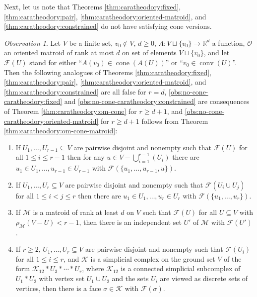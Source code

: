 \documentclass[a4paper,11pt,reqno, english]{amsart}
\theoremstyle{definition}
\theoremstyle{remark}
\newtheorem{observation}[theorem]{Observation}
\newcommand\R{\mathbb R}
\DeclareMathOperator{\cone}{\mathrm{cone}}
\DeclareMathOperator{\conv}{\mathrm{conv}}
\begin{document}
Next, let us note that Theorems \ref{thm:caratheodory:fixed}, \ref{thm:caratheodory:pair}, \ref{thm:caratheodory:oriented-matroid}, and \ref{thm:caratheodory:constrained} do not have satisfying cone versions.
\begin{observation}\label{obs:no-cone-caratheodory}
    Let $V$ be a finite set, $v_0\notin V$, $d\geq 0$, $A\colon{V\sqcup\{v_0\}}\to\R^d$ a function, $\mathscr{O}$ an oriented matroid of rank at most $d$ on set of elements $V\sqcup\{v_0\}$, and let $\mathcal{F}(U)$ stand for either ``$A(v_0)\in\cone(A(U))$'' or ``$v_0\in\conv(U)$''. Then the following analogues of Theorems \ref{thm:caratheodory:fixed}, \ref{thm:caratheodory:pair}, \ref{thm:caratheodory:oriented-matroid}, and \ref{thm:caratheodory:constrained} are all false for $r=d$, \ref{obs:no-cone-caratheodory:fixed} and \ref{obs:no-cone-caratheodory:constrained} are consequences of Theorem \ref{thm:caratheodory:om-cone} for $r\geq d+1$, and \ref{obs:no-cone-caratheodory:oriented-matroid} for $r\geq d+1$ follows from Theorem \ref{thm:caratheodory:om-cone-matroid}:
    \begin{enumerate}[label=\normalfont{(\arabic*)}]
        \item\label{obs:no-cone-caratheodory:fixed} If $U_1,\ldots,U_{r-1}\subseteq V$ are pairwise disjoint and nonempty such that $\mathcal{F}(U)$ for all $1\leq i\leq r-1$ then for any $u\in V-\bigcup_{i=1}^{r-1}(U_i)$ there are $u_1\in U_1,\ldots,u_{r-1}\in U_{r-1}$ with $\mathcal{F}(\{u_1,\ldots,u_{r-1},u\})$.
        \item\label{obs:no-cone-caratheodory:pair} If $U_1,\ldots,U_r\subseteq V$ are pairwise disjoint and nonempty such that $\mathcal{F}(U_i\cup U_j)$ for all $1\leq i<j\leq r$ then there are $u_1\in U_1,\ldots,u_r\in U_r$ with $\mathcal{F}(\{u_1,\ldots,u_r\})$.
        \item\label{obs:no-cone-caratheodory:oriented-matroid} If $\mathscr{M}$ is a matroid of rank at least $d$ on $V$ such that $\mathcal{F}(U)$ for all $U\subseteq V$ with $\rho_\mathscr{M}(V-U)<r-1$, then there is an independent set $U'$ of $\mathscr{M}$ with $\mathcal{F}(U')$. 
        \item\label{obs:no-cone-caratheodory:constrained} If $r\geq 2$, $U_1,\ldots,U_r\subseteq V$ are pairwise disjoint and nonempty such that $\mathcal{F}(U_i)$ for all $1\leq i\leq r$, and $\mathscr{K}$ is a simplicial complex on the ground set $V$ of the form $\mathscr{K}_{12}*U_3*\cdots*U_r$, where $\mathscr{K}_{12}$ is a connected simplicial subcomplex of $U_1*U_2$ with vertex set $U_1\cup U_2$ and the sets $U_i$ are viewed as discrete sets of vertices, then there is a face $\sigma\in\mathscr{K}$ with $\mathcal{F}(\sigma)$. 
    \end{enumerate}
\end{observation}
\end{document}
